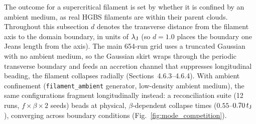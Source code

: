 \documentclass[usenatbib,twoside,twocolumn]{mnras}
\begin{document}
The outcome for a supercritical filament is set by whether it is confined by an ambient medium, as real HGBS filaments are within their parent clouds. Throughout this subsection $d$ denotes the transverse distance from the filament axis to the domain boundary, in units of $\lambda_{\rm J}$ (so $d=1.0$ places the boundary one Jeans length from the axis). The main 654-run grid uses a truncated Gaussian with no ambient medium, so the Gaussian skirt wraps through the periodic transverse boundary and feeds an accretion channel that suppresses longitudinal beading, the filament collapses radially (Sections~4.6.3--4.6.4). With ambient confinement (\texttt{filament\_ambient} generator, low-density ambient medium), the same configurations fragment longitudinally instead: a reconciliation suite (12 runs, $f\times\beta\times2$ seeds) beads at physical, $\beta$-dependent collapse times ($0.55$--$0.70\,t_{\rm J}$), converging across boundary conditions (Fig.~\ref{fig:mode_competition}).
\end{document}
